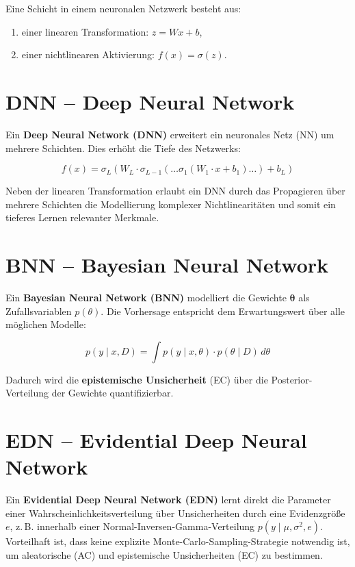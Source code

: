 Eine Schicht in einem neuronalen Netzwerk besteht aus:
\begin{enumerate}
  \item einer linearen Transformation: \( z = Wx + b \),
  \item einer nichtlinearen Aktivierung: \( f(x) = \sigma(z) \).
\end{enumerate}


\section*{DNN – Deep Neural Network}

Ein \textbf{Deep Neural Network (DNN)} erweitert ein neuronales Netz (NN) um mehrere Schichten. Dies erhöht die Tiefe des Netzwerks:

\[
f(x) = \sigma_L\left(W_L \cdot \sigma_{L-1}\left(\ldots \sigma_1\left(W_1 \cdot x + b_1\right) \ldots \right) + b_L\right)
\]

Neben der linearen Transformation erlaubt ein DNN durch das Propagieren über mehrere Schichten die Modellierung komplexer Nichtlinearitäten und somit ein tieferes Lernen relevanter Merkmale.

\section*{BNN – Bayesian Neural Network}

Ein \textbf{Bayesian Neural Network (BNN)} modelliert die Gewichte $\boldsymbol{\theta}$ als Zufallsvariablen $p(\theta)$. Die Vorhersage entspricht dem Erwartungswert über alle möglichen Modelle:

\[
p(y \mid x, D) = \int p(y \mid x, \theta) \cdot p(\theta \mid D) \, d\theta
\]

Dadurch wird die \textbf{epistemische Unsicherheit} (EC) über die Posterior-Verteilung der Gewichte quantifizierbar.

\section*{EDN – Evidential Deep Neural Network}

Ein \textbf{Evidential Deep Neural Network (EDN)} lernt direkt die Parameter einer Wahrscheinlichkeitsverteilung über Unsicherheiten durch eine Evidenzgröße $e$, z.\,B. innerhalb einer Normal-Inversen-Gamma-Verteilung $p(y \mid \mu, \sigma^2, e)$. Vorteilhaft ist, dass keine explizite Monte-Carlo-Sampling-Strategie notwendig ist, um aleatorische (AC) und epistemische Unsicherheiten (EC) zu bestimmen.

